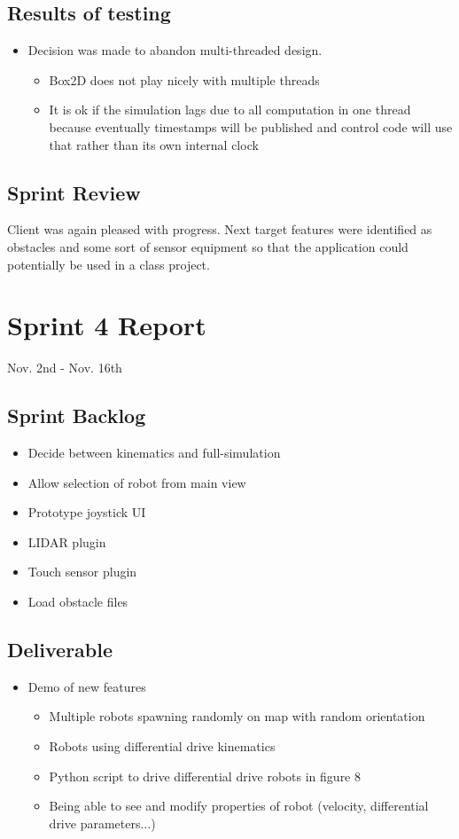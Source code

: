 \subsection{Results of testing}
\begin{itemize}
	\item Decision was made to abandon multi-threaded design.
	\begin{itemize}
		\item Box2D does not play nicely with multiple threads
		\item It is ok if the simulation lags due to all computation in one thread because eventually timestamps will be published and control code will use that rather than its own internal clock
	\end{itemize}
\end{itemize}
\subsection{Sprint Review}
Client was again pleased with progress. Next target features were identified as obstacles and some sort of sensor equipment so that the application could potentially be used in a class project.

\section{Sprint 4 Report}
Nov. 2nd - Nov. 16th
\subsection{Sprint Backlog}
\begin{itemize}
	\item Decide between kinematics and full-simulation
	\item Allow selection of robot from main view
	\item Prototype joystick UI
	\item LIDAR plugin
	\item Touch sensor plugin
	\item Load obstacle files
\end{itemize}
\subsection{Deliverable}
\begin{itemize}
	\item Demo of new features
	\begin{itemize}
		\item Multiple robots spawning randomly on map with random orientation
		\item Robots using differential drive kinematics
		\item Python script to drive differential drive robots in figure 8
		\item Being able to see and modify properties of robot (velocity, differential drive parameters...)
	\end{itemize}
\end{itemize}
